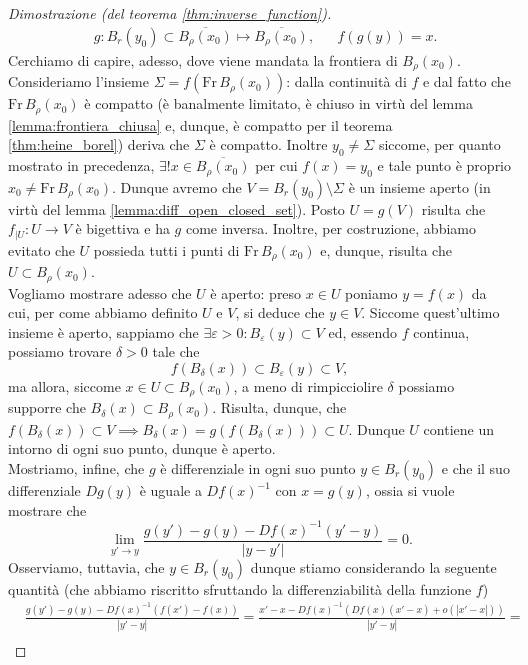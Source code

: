 \begin{proof}[Dimostrazione (del teorema \ref{thm:inverse_function})]
	\begin{align*}
		&g: B_{r}(y_0) \subset \overline{B_{\rho} (x_0)} \mapsto \overline{B_\rho(x_0)}, & &f(g(y)) = x.
    \end{align*}
	Cerchiamo di capire, adesso, dove viene mandata la frontiera di $B_\rho(x_0)$. Consideriamo l'insieme $\Sigma = f(\text{Fr} \, B_\rho(x_0))$: dalla continuità di $f$ e dal fatto che $\text{Fr} \, B_\rho(x_0)$ è compatto (è banalmente limitato, è chiuso in virtù del lemma \ref{lemma:frontiera_chiusa} e, dunque, è compatto per il teorema \ref{thm:heine_borel}) deriva che $\Sigma$ è compatto. Inoltre
    $y_0 \neq \Sigma$ siccome, per quanto mostrato in precedenza, $\exists ! x \in \overline{B_\rho(x_0)}$ per cui $f(x) = y_0$ e tale punto è proprio $x_0 \neq \text{Fr} \, B_\rho(x_0)$. Dunque avremo che $V = B_r(y_0) \setminus \Sigma$ è un insieme aperto (in virtù del lemma \ref{lemma:diff_open_closed_set}). Posto $U = g(V)$ risulta che $f_{|U} : U \to V$ è bigettiva
    e ha $g$ come inversa. Inoltre, per costruzione, abbiamo evitato che $U$ possieda tutti i punti di $\text{Fr} \, B_\rho(x_0)$ e, dunque, risulta che $U \subset B_\rho(x_0)$. \\
    Vogliamo mostrare adesso che $U$ è aperto: preso $x \in U$ poniamo $y = f(x)$ da cui, per come abbiamo definito $U$ e $V$, si deduce che $y \in V$. Siccome quest'ultimo insieme è aperto, sappiamo che $\exists \varepsilon > 0: B_\varepsilon(y) \subset V$ ed, essendo $f$ continua, possiamo trovare $\delta > 0$ tale che
    $$
    f(B_\delta(x)) \subset B_\varepsilon(y) \subset V,
    $$
    ma allora, siccome $x \in U \subset B_\rho(x_0)$, a meno di rimpicciolire $\delta$ possiamo supporre che $B_\delta(x) \subset B_\rho(x_0)$. Risulta, dunque, che $f(B_\delta(x)) \subset V \implies B_\delta(x) = g(f(B_\delta(x))) \subset U$. Dunque $U$ contiene un intorno di ogni suo punto, dunque è aperto. \\
    Mostriamo, infine, che $g$ è differenziale in ogni suo punto $y \in B_r(y_0)$ e che il suo differenziale $Dg(y)$ è uguale a $Df(x)^{-1}$ con $x = g(y)$, ossia si vuole mostrare che
    $$
        \lim_{y' \to y} \frac{g(y') - g(y) - Df(x)^{-1}(y'-y)}{|y-y'|} = 0.
    $$
    Osserviamo, tuttavia, che $y \in B_r(y_0)$ dunque stiamo considerando la seguente quantità (che abbiamo riscritto sfruttando la differenziabilità della funzione $f$)
    \begin{align*}
    &\frac{g(y') - g(y) - Df(x)^{-1}(f(x')-f(x))}{|y' - y|} = \frac{x' - x - Df(x)^{-1}(Df(x)(x'-x) + o(|x' - x|))}{|y' - y|} = \\

\end{align*}
\end{proof}
